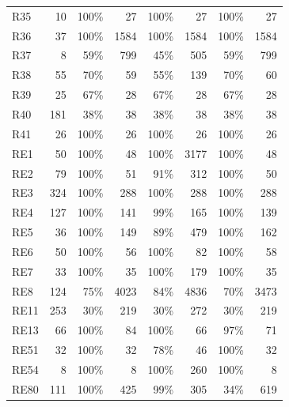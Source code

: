 {\begin{longtable}{@{}lrrrrrrr@{}}
	R35 & 10 & 100\% & 27 & 100\% & 27 & 100\% & 27 \\
	R36 & 37 & 100\% & 1584 & 100\% & 1584 & 100\% & 1584 \\
	R37 & 8 & 59\% & 799 & 45\% & 505 & 59\% & 799 \\
	R38 & 55 & 70\% & 59 & 55\% & 139 & 70\% & 60 \\
	R39 & 25 & 67\% & 28 & 67\% & 28 & 67\% & 28 \\
	R40 & 181 & 38\% & 38 & 38\% & 38 & 38\% & 38 \\
	R41 & 26 & 100\% & 26 & 100\% & 26 & 100\% & 26 \\
	RE1 & 50 & 100\% & 48 & 100\% & 3177 & 100\% & 48 \\
	RE2 & 79 & 100\% & 51 & 91\% & 312 & 100\% & 50 \\
	RE3 & 324 & 100\% & 288 & 100\% & 288 & 100\% & 288 \\
	RE4 & 127 & 100\% & 141 & 99\% & 165 & 100\% & 139 \\
	RE5 & 36 & 100\% & 149 & 89\% & 479 & 100\% & 162 \\
	RE6 & 50 & 100\% & 56 & 100\% & 82 & 100\% & 58 \\
	RE7 & 33 & 100\% & 35 & 100\% & 179 & 100\% & 35 \\
	RE8 & 124 & 75\% & 4023 & 84\% & 4836 & 70\% & 3473 \\
	RE11 & 253 & 30\% & 219 & 30\% & 272 & 30\% & 219 \\
	RE13 & 66 & 100\% & 84 & 100\% & 66 & 97\% & 71 \\
	RE51 & 32 & 100\% & 32 & 78\% & 46 & 100\% & 32 \\
	RE54 & 8 & 100\% & 8 & 100\% & 260 & 100\% & 8 \\
	RE80 & 111 & 100\% & 425 & 99\% & 305 & 34\% & 619 \\
	\bottomrule
\end{longtable}
}
